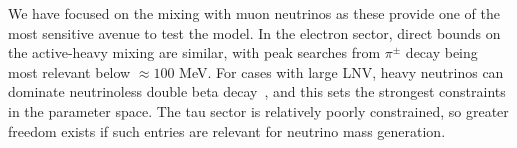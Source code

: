 We have focused on the mixing with muon neutrinos as these provide one of the most sensitive avenue to test the model. In the electron sector, direct bounds on the active-heavy mixing are similar, with peak searches from $\pi^\pm$ decay being most relevant below $\approx 100$ MeV. For cases with large LNV, heavy neutrinos can dominate neutrinoless double beta decay~\cite{LopezPavon:2012zg}, and this sets the strongest constraints in the parameter space. The tau sector is relatively poorly constrained, so greater freedom exists if such entries are relevant for neutrino mass generation. 


